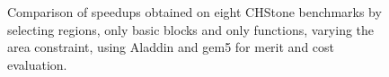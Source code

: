 \documentclass[]{usiinfthesis}
\begin{document}
\begin{figure}
{}
\caption{Comparison of speedups obtained on eight CHStone benchmarks
  by selecting regions, only basic blocks and only functions, varying
  the area constraint, using Aladdin and gem5 for merit and cost evaluation. }
\label{fig:regions_aladdin}
\end{figure}

\end{document}
